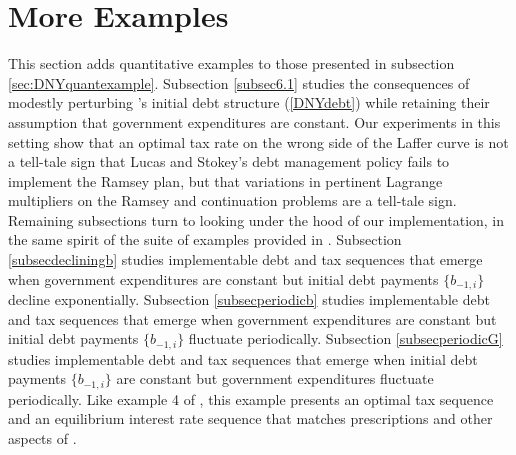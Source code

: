 \documentclass[12pt]{article}
\newcommand{\NW}[1]{{\textcolor{blue}{#1}}}
\begin{document}
\section{More Examples\label{sec:moreexamples}} %
%
%
This section adds  quantitative examples to those presented in subsection \ref{sec:DNYquantexample}.
Subsection \ref{subsec6.1} studies the consequences of modestly  perturbing \citeauthor{debortoli2021optimal}'s initial debt structure (\ref{DNYdebt}) while retaining their assumption that government expenditures are constant.  Our experiments in this setting show  that  an optimal tax rate on the wrong side of the Laffer curve is  not a tell-tale sign that Lucas and Stokey's debt management policy fails to implement the Ramsey plan, but that  {variations in pertinent Lagrange multipliers on the Ramsey and continuation problems are a tell-tale sign.} %
Remaining subsections turn to  looking  under the hood of our implementation, in the same  spirit of  the suite of examples provided in \citet[Sec.~3]{LucasStokey1983}.
Subsection \ref{subsecdecliningb}  studies implementable debt and tax sequences that emerge when government expenditures are constant but  initial debt payments $\{b_{-1,i}\}$ decline exponentially. 
Subsection \ref{subsecperiodicb} studies implementable debt and tax sequences that emerge when government expenditures are constant but  initial debt payments $\{b_{-1,i}\}$ fluctuate periodically.  
Subsection \ref{subsecperiodicG} studies implementable debt and tax sequences that emerge when initial debt payments $\{b_{-1,i}\}$   are constant but government expenditures  fluctuate periodically.  {Like example 4 of  \citet[sec.~3]{LucasStokey1983}, this example  presents  an optimal  tax sequence and an  equilibrium interest rate sequence that matches prescriptions and other aspects 
of  \citet{barro1979determination}.} 
%
\end{document}
